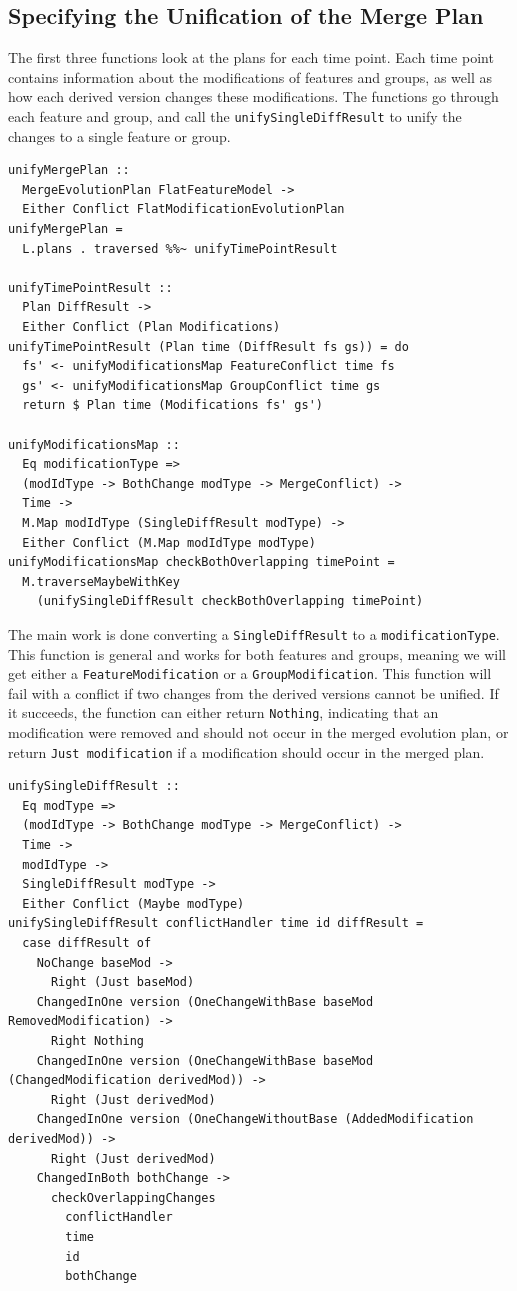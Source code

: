 \documentclass[a4paper,english]{ifimaster}
\begin{document}
\subsection{Specifying the Unification of the Merge Plan}%
\label{sub:specifying_the_unification_of_the_merge_plan}

The first three functions look at the plans for each time point. Each time point contains information about the modifications of features and groups, as well as how each derived version changes these modifications. The functions go through each feature and group, and call the \texttt{unify\-Single\-Diff\-Result} to unify the changes to a single feature or group.

\begin{verbatim}
unifyMergePlan ::
  MergeEvolutionPlan FlatFeatureModel ->
  Either Conflict FlatModificationEvolutionPlan
unifyMergePlan =
  L.plans . traversed %%~ unifyTimePointResult

unifyTimePointResult ::
  Plan DiffResult ->
  Either Conflict (Plan Modifications)
unifyTimePointResult (Plan time (DiffResult fs gs)) = do
  fs' <- unifyModificationsMap FeatureConflict time fs
  gs' <- unifyModificationsMap GroupConflict time gs
  return $ Plan time (Modifications fs' gs')

unifyModificationsMap ::
  Eq modificationType =>
  (modIdType -> BothChange modType -> MergeConflict) ->
  Time ->
  M.Map modIdType (SingleDiffResult modType) ->
  Either Conflict (M.Map modIdType modType)
unifyModificationsMap checkBothOverlapping timePoint =
  M.traverseMaybeWithKey
    (unifySingleDiffResult checkBothOverlapping timePoint)
\end{verbatim}

The main work is done converting a \texttt{Single\-Diff\-Result} to a \texttt{modification\-Type}. This function is general and works for both features and groups, meaning we will get either a \texttt{Feature\-Modification} or a \texttt{Group\-Modification}. This function will fail with a conflict if two changes from the derived versions cannot be unified. If it succeeds, the function can either return \texttt{Nothing}, indicating that an modification were removed and should not occur in the merged evolution plan, or return \texttt{Just modification} if a modification should occur in the merged plan.

\begin{verbatim}
unifySingleDiffResult ::
  Eq modType =>
  (modIdType -> BothChange modType -> MergeConflict) ->
  Time ->
  modIdType ->
  SingleDiffResult modType ->
  Either Conflict (Maybe modType)
unifySingleDiffResult conflictHandler time id diffResult =
  case diffResult of
    NoChange baseMod ->
      Right (Just baseMod)
    ChangedInOne version (OneChangeWithBase baseMod RemovedModification) ->
      Right Nothing
    ChangedInOne version (OneChangeWithBase baseMod (ChangedModification derivedMod)) ->
      Right (Just derivedMod)
    ChangedInOne version (OneChangeWithoutBase (AddedModification derivedMod)) ->
      Right (Just derivedMod)
    ChangedInBoth bothChange ->
      checkOverlappingChanges
        conflictHandler
        time
        id
        bothChange
\end{verbatim}
\end{document}
